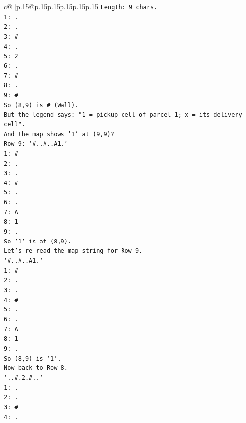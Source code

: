 \documentclass{article}
\begin{document}
{\begin{supertabular}{c@{$\;$}|p{.15\linewidth}@{}p{.15\linewidth}p{.15\linewidth}p{.15\linewidth}p{.15\linewidth}p{.15\linewidth}}
{{{\texttt{Length: 9 chars.} \\
\texttt{1: .} \\
\texttt{2: .} \\
\texttt{3: \#} \\
\texttt{4: .} \\
\texttt{5: 2} \\
\texttt{6: .} \\
\texttt{7: \#} \\
\texttt{8: .} \\
\texttt{9: \#} \\
\texttt{So (8,9) is \# (Wall).} \\
\texttt{But the legend says: "1 = pickup cell of parcel 1; x = its delivery cell".} \\
\texttt{And the map shows '1' at (9,9)?} \\
\texttt{Row 9: `\#..\#..A1.`} \\
\texttt{1: \#} \\
\texttt{2: .} \\
\texttt{3: .} \\
\texttt{4: \#} \\
\texttt{5: .} \\
\texttt{6: .} \\
\texttt{7: A} \\
\texttt{8: 1} \\
\texttt{9: .} \\
\texttt{So '1' is at (8,9).} \\
\texttt{Let's re{-}read the map string for Row 9.} \\
\texttt{`\#..\#..A1.`} \\
\texttt{1: \#} \\
\texttt{2: .} \\
\texttt{3: .} \\
\texttt{4: \#} \\
\texttt{5: .} \\
\texttt{6: .} \\
\texttt{7: A} \\
\texttt{8: 1} \\
\texttt{9: .} \\
\texttt{So (8,9) is '1'.} \\
\texttt{Now back to Row 8.} \\
\texttt{`..\#.2.\#..`} \\
\texttt{1: .} \\
\texttt{2: .} \\
\texttt{3: \#} \\
\texttt{4: .} \\
}}}
\end{supertabular}}
\end{document}
